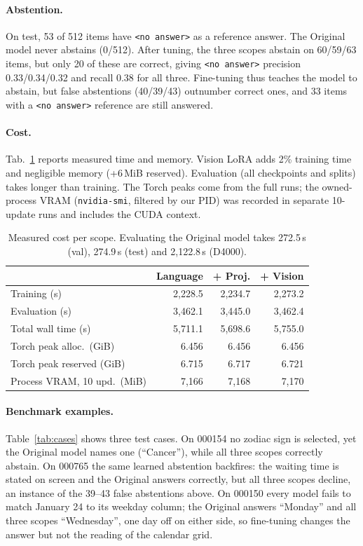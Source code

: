 \documentclass[10pt,twocolumn,letterpaper]{article}
\newcommand{\noans}{\texttt{\textless no answer\textgreater}}
\begin{document}
\paragraph{Abstention.} On test, 53 of 512 items have \noans{} as a reference answer. The Original model never abstains (0/512). After tuning, the three scopes abstain on 60/59/63 items, but only 20 of these are correct, giving \noans{} precision 0.33/0.34/0.32 and recall 0.38 for all three. Fine-tuning thus teaches the model to abstain, but false abstentions (40/39/43) outnumber correct ones, and 33 items with a \noans{} reference are still answered.

\paragraph{Cost.} Tab.~\ref{tab:cost} reports measured time and memory. Vision LoRA adds 2\% training time and negligible memory (+6\,MiB reserved). Evaluation (all checkpoints and splits) takes longer than training. The Torch peaks come from the full runs; the owned-process VRAM (\texttt{nvidia-smi}, filtered by our PID) was recorded in separate 10-update runs and includes the CUDA context.

\begin{table}[t]
  \centering
  \small
  \setlength{\tabcolsep}{4pt}
  \begin{tabular}{lrrr}
    \toprule
    & Language & + Proj. & + Vision \\
    \midrule
    Training (s)                   & 2,228.5 & 2,234.7 & 2,273.2 \\
    Evaluation (s)                 & 3,462.1 & 3,445.0 & 3,462.4 \\
    Total wall time (s)            & 5,711.1 & 5,698.6 & 5,755.0 \\
    Torch peak alloc.\ (GiB)       & 6.456 & 6.456 & 6.456 \\
    Torch peak reserved (GiB)      & 6.715 & 6.717 & 6.721 \\
    Process VRAM, 10 upd.\ (MiB)   & 7,166 & 7,168 & 7,170 \\
    \bottomrule
  \end{tabular}
  \caption{Measured cost per scope. Evaluating the Original model takes 272.5\,s (val), 274.9\,s (test) and 2,122.8\,s (D4000).}
  \label{tab:cost}
\end{table}

\paragraph{Benchmark examples.} Table~\ref{tab:cases} shows three test cases. On 000154 no zodiac sign is selected, yet the Original model names one (``Cancer''), while all three scopes correctly abstain. On 000765 the same learned abstention backfires: the waiting time is stated on screen and the Original answers correctly, but all three scopes decline, an instance of the 39--43 false abstentions above. On 000150 every model fails to match January 24 to its weekday column; the Original answers ``Monday'' and all three scopes ``Wednesday'', one day off on either side, so fine-tuning changes the answer but not the reading of the calendar grid.
\end{document}
